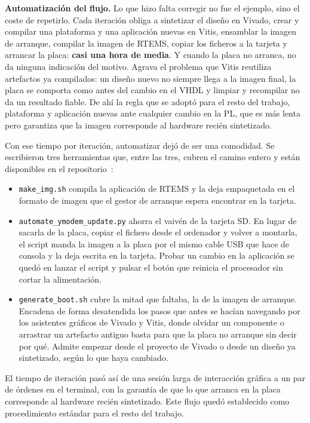 \textbf{Automatización del flujo.} Lo que hizo falta corregir no fue el ejemplo, sino el coste de
repetirlo. Cada iteración obliga a sintetizar el diseño en Vivado, crear y compilar una plataforma
y una aplicación nuevas en Vitis, ensamblar la imagen de arranque, compilar la imagen de RTEMS,
copiar los ficheros a la tarjeta y arrancar la placa: \textbf{casi una hora de media}. Y cuando la
placa no arranca, no da ninguna indicación del motivo. Agrava el problema que Vitis reutiliza
artefactos ya compilados: un diseño nuevo no siempre llega a la imagen final, la placa se comporta
como antes del cambio en el VHDL y limpiar y recompilar no da un resultado fiable. De ahí la regla
que se adoptó para el resto del trabajo, plataforma y aplicación nuevas ante cualquier cambio en
la PL, que es más lenta pero garantiza que la imagen corresponde al hardware recién sintetizado.

Con ese tiempo por iteración, automatizar dejó de ser una comodidad. Se escribieron tres
herramientas que, entre las tres, cubren el camino entero y están disponibles en el
repositorio~\cite{repo_tfm}:

\begin{itemize}
    \item \texttt{make\_img.sh} compila la aplicación de RTEMS y la deja empaquetada en el formato
    de imagen que el gestor de arranque espera encontrar en la tarjeta.

    \item \texttt{automate\_ymodem\_update.py} ahorra el vaivén de la tarjeta SD. En lugar de
    sacarla de la placa, copiar el fichero desde el ordenador y volver a montarla, el script manda
    la imagen a la placa por el mismo cable USB que hace de consola y la deja escrita en la
    tarjeta. Probar un cambio en la aplicación se quedó en lanzar el script y pulsar el botón que
    reinicia el procesador sin cortar la alimentación.

    \item \texttt{generate\_boot.sh} cubre la mitad que faltaba, la de la imagen de arranque.
    Encadena de forma desatendida los pasos que antes se hacían navegando por los asistentes
    gráficos de Vivado y Vitis, donde olvidar un componente o arrastrar un artefacto antiguo basta
    para que la placa no arranque sin decir por qué. Admite empezar desde el proyecto de Vivado o
    desde un diseño ya sintetizado, según lo que haya cambiado.
\end{itemize}

El tiempo de iteración pasó así de una sesión larga de interacción gráfica a un par de órdenes en
el terminal, con la garantía de que lo que arranca en la placa corresponde al hardware recién
sintetizado. Este flujo quedó establecido como procedimiento estándar para el resto del trabajo.

